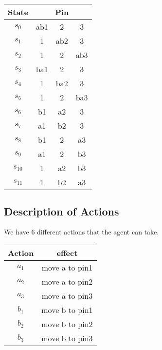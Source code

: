\documentclass[a4paper]{article}
\begin{document}
\begin{tabular}{ c|c|c|c}
	State & \multicolumn{3}{c}{Pin} \\
	\hline
	$s_{0}$ & ab1 & 2 & 3 \\
	$s_{1}$ & 1 & ab2 & 3 \\
	$s_{2}$ & 1 & 2 & ab3 \\
	$s_{3}$ & ba1 & 2 & 3 \\
	$s_{4}$ & 1 & ba2 & 3 \\
	$s_{5}$ & 1 & 2 & ba3 \\
	$s_{6}$ & b1 & a2 & 3 \\
	$s_{7}$ & a1 & b2 & 3 \\
	$s_{8}$ & b1 & 2 & a3 \\
	$s_{9}$ & a1 & 2 & b3 \\
	$s_{10}$ & 1 & a2 & b3 \\
	$s_{11}$ & 1 & b2 & a3

\end{tabular}

\newpage
\subsection{Description of Actions}
We have 6 different actions that the agent can take. \\

\begin{tabular}{c|c}
Action & effect \\
\hline
$a_{1}$ & move a to pin1 \\
$a_{2}$ & move a to pin2 \\
$a_{3}$ & move a to pin3 \\
$b_{1}$ & move b to pin1 \\
$b_{2}$ & move b to pin2 \\
$b_{3}$ & move b to pin3
\end{tabular}
\end{document}

